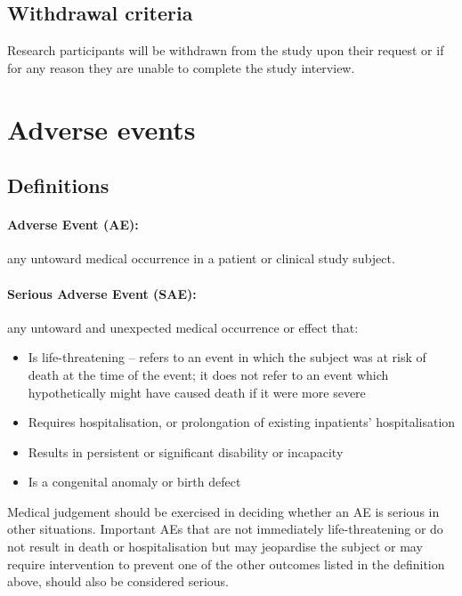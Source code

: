 \documentclass[a4paper,10pt]{article}
\begin{document}
\subsection{Withdrawal criteria} 
Research participants will be withdrawn from the study upon their request or if for any reason they are unable to complete the study interview. 

\section{Adverse events}

\subsection{Definitions}

\paragraph{Adverse Event (AE):}any untoward medical occurrence in a patient or clinical study subject.  

\paragraph{Serious Adverse Event (SAE):}any untoward and unexpected medical occurrence or effect that: \begin{itemize}
	\item Is life-threatening – refers to an event in which the subject was at risk of death at the time of the event; it does not refer to an event which hypothetically might have caused death if it were more severe
	\item Requires hospitalisation, or prolongation of existing inpatients’ hospitalisation
    \item Results in persistent or significant disability or incapacity
	\item Is a congenital anomaly or birth defect
                                                                                              \end{itemize}


Medical judgement should be exercised in deciding whether an AE is serious in other situations. Important AEs that are not immediately life-threatening or do not result in death or hospitalisation but may jeopardise the subject or may require intervention to prevent one of the other outcomes listed in the definition above, should also be considered serious.
\end{document}
